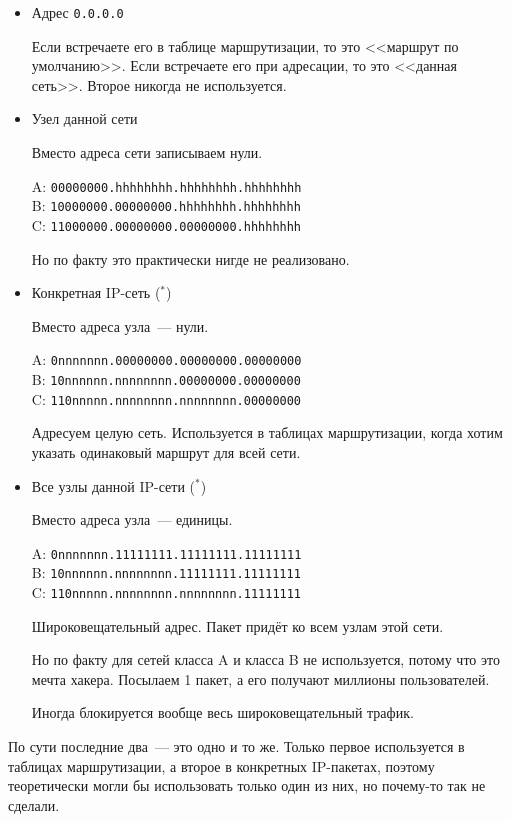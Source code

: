 \begin{itemize}
    \item Адрес {\tt 0.0.0.0}

    Если встречаете его в таблице маршрутизации, то это <<маршрут по умолчанию>>. Если встречаете его при адресации, то это <<данная сеть>>. Второе никогда не используется.
    \item Узел данной сети

    Вместо адреса сети записываем нули.

    A: {\tt 00000000.hhhhhhhh.hhhhhhhh.hhhhhhhh}\\
    B: {\tt 10000000.00000000.hhhhhhhh.hhhhhhhh}\\
    C: {\tt 11000000.00000000.00000000.hhhhhhhh}

    Но по факту это практически нигде не реализовано.

    \item Конкретная IP-сеть ($^*$)

    Вместо адреса узла~--- нули.

    A: {\tt 0nnnnnnn.00000000.00000000.00000000}\\
    B: {\tt 10nnnnnn.nnnnnnnn.00000000.00000000}\\
    C: {\tt 110nnnnn.nnnnnnnn.nnnnnnnn.00000000}

    Адресуем целую сеть. Используется в таблицах маршрутизации, когда хотим указать одинаковый маршрут для всей сети.

    \item Все узлы данной IP-сети ($^*$)

    Вместо адреса узла~--- единицы.

    A: {\tt 0nnnnnnn.11111111.11111111.11111111}\\
    B: {\tt 10nnnnnn.nnnnnnnn.11111111.11111111}\\
    C: {\tt 110nnnnn.nnnnnnnn.nnnnnnnn.11111111}

    Широковещательный адрес. Пакет придёт ко всем узлам этой сети. 

    Но по факту для сетей класса A и класса B не используется, потому что это мечта хакера. Посылаем 1 пакет, а его получают миллионы пользователей.

    Иногда блокируется вообще весь широковещательный трафик.

\end{itemize}

По сути последние два~--- это одно и то же. Только первое используется в таблицах маршрутизации, а второе в конкретных IP-пакетах, поэтому теоретически могли бы использовать только один из них, но почему-то так не сделали.

